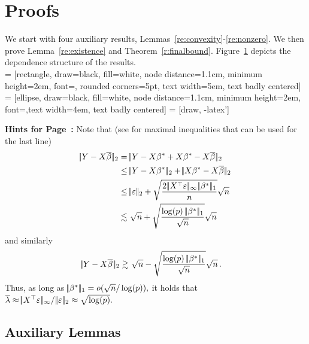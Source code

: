 \documentclass[bj]{imsart}
\newcommand{\normsup}[1]{\ensuremath{\!|\!| #1 | \! |_{\infty}}}
\newcommand{\normone}[1]{\ensuremath{\!|\!| #1 | \! |_{1}}}
\newcommand{\normtwo}[1]{\ensuremath{\!|\!| #1 | \! |_{2}}}
\newcommand{\1}{{\rm 1}\mskip -4,5mu{\rm l} }
\newcommand{\lo}{\overline{\lambda}}
\begin{document}

\pagebreak
\appendix
\section{Proofs}\label{sec:proofs}

We start with four auxiliary results, Lemmas~\ref{re:convexity}-\ref{re:nonzero}. 
We then prove Lemma~\ref{re:existence} and Theorem~\ref{r:finalbound}. Figure~\ref{fig:dependence} depicts the dependence structure of the results.\\

 = [rectangle, draw=black, fill=white, node distance=1.1cm, minimum height=2em, font=\color{black}\sffamily, rounded corners=5pt, text width=5em, text badly centered]
 = [ellipse, draw=black, fill=white, node distance=1.1cm, minimum height=2em, font=\color{black}\sffamily,text width=4em, text badly centered]
 = [draw, -latex']
    
    
\begin{figure}[omitted: a diagram of this paper's results, not reproduced here]\label{fig:dependence}\end{figure}
{\bf Hints for Page~\pageref{sqrtex}:}\label{sqrtexproof}
Note that (see \cite[Section~2.2]{vanderVaart96} for maximal inequalities that can be used for the last line)
\begin{align*}
\normtwo{\outcome-\design\estimatororacle}
= &\ \normtwo{\outcome-\design\truth+\design\truth-\design\estimatororacle}\\
\le&\ \normtwo{\outcome-\design\truth}+\normtwo{\design\truth-\design\estimatororacle}\\
\le& \ \normtwo{\noise}+\sqrt{\frac{2\,\normsup{\design^\top\noise}\,\normone{\truth}}{n}}\sqrt{n}\\
\lesssim& \ \sqrt{n}+\sqrt{\frac{\log(p)\ \normone{\truth}}{\sqrt n}}\sqrt{n}
\end{align*}
and similarly 
\begin{align*}
\normtwo{\outcome-\design\estimatororacle}
\gtrsim& \ \sqrt{n}-\sqrt{\frac{\log(p)\ \normone{\truth}}{\sqrt n}}\sqrt{n}\,.
\end{align*}
Thus, as long as $\normone{\truth}=o(\sqrt n/\log (p)),$ it holds that $\lo\approx \normsup{\design^\top\noise}/\,\normtwo{\noise}\approx\sqrt{\log(p)}.$ 

\subsection{Auxiliary Lemmas}
\end{document}
